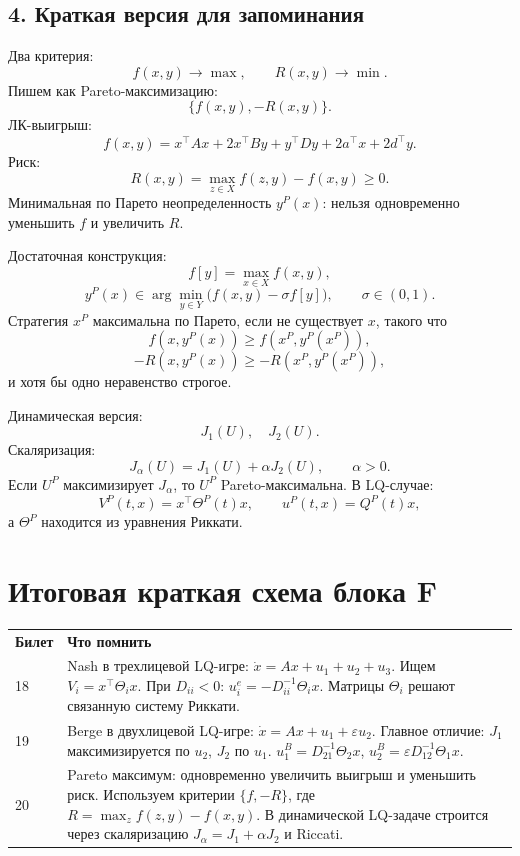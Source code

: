 \documentclass[12pt,a4paper]{article}
\newcommand{\memory}{\subsection*{4. Краткая версия для запоминания}}
\begin{document}
\memory
Два критерия:
\[
f(x,y)\to\max,
\qquad R(x,y)\to\min.
\]
Пишем как Pareto-максимизацию:
\[
\{f(x,y),-R(x,y)\}.
\]
ЛК-выигрыш:
\[
f(x,y)=x^{\top}Ax+2x^{\top}By+y^{\top}Dy+2a^{\top}x+2d^{\top}y.
\]
Риск:
\[
R(x,y)=\max_{z\in X}f(z,y)-f(x,y)\ge0.
\]
Минимальная по Парето неопределенность \(y^P(x)\): нельзя одновременно уменьшить \(f\) и увеличить \(R\).

Достаточная конструкция:
\[
f[y]=\max_{x\in X}f(x,y),
\]
\[
y^P(x)\in\arg\min_{y\in Y}\bigl(f(x,y)-\sigma f[y]\bigr),
\qquad \sigma\in(0,1).
\]
Стратегия \(x^P\) максимальна по Парето, если не существует \(x\), такого что
\[
f(x,y^P(x))\ge f(x^P,y^P(x^P)),
\]
\[
-R(x,y^P(x))\ge -R(x^P,y^P(x^P)),
\]
и хотя бы одно неравенство строгое.

Динамическая версия:
\[
J_1(U),\quad J_2(U).
\]
Скаляризация:
\[
J_\alpha(U)=J_1(U)+\alpha J_2(U),\qquad \alpha>0.
\]
Если \(U^P\) максимизирует \(J_\alpha\), то \(U^P\) Pareto-максимальна.
В LQ-случае:
\[
V^P(t,x)=x^{\top}\Theta^P(t)x,
\qquad u^P(t,x)=Q^P(t)x,
\]
а \(\Theta^P\) находится из уравнения Риккати.

\section*{Итоговая краткая схема блока F}
\begin{center}
\begin{tabular}{p{2cm}p{12cm}}
\textbf{Билет} & \textbf{Что помнить} \\
18 & Nash в трехлицевой LQ-игре: \(\dot x=Ax+u_1+u_2+u_3\). Ищем \(V_i=x^{\top}\Theta_i x\). При \(D_{ii}<0\): \(u_i^e=-D_{ii}^{-1}\Theta_i x\). Матрицы \(\Theta_i\) решают связанную систему Риккати. \\
19 & Berge в двухлицевой LQ-игре: \(\dot x=Ax+u_1+\varepsilon u_2\). Главное отличие: \(J_1\) максимизируется по \(u_2\), \(J_2\) по \(u_1\). \(u_1^B=D_{21}^{-1}\Theta_2x\), \(u_2^B=\varepsilon D_{12}^{-1}\Theta_1x\). \\
20 & Pareto максимум: одновременно увеличить выигрыш и уменьшить риск. Используем критерии \(\{f,-R\}\), где \(R=\max_z f(z,y)-f(x,y)\). В динамической LQ-задаче строится через скаляризацию \(J_\alpha=J_1+\alpha J_2\) и Riccati. \\
\end{tabular}
\end{center}
\end{document}
